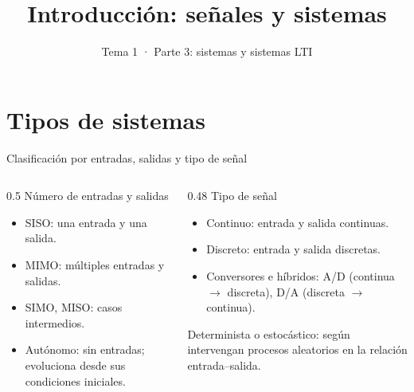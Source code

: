 \documentclass[aspectratio=169,11pt]{beamer}
\title[T1 · Sistemas]{Introducción: señales y sistemas}
\subtitle{Tema 1 · Parte 3: sistemas y sistemas LTI}
\begin{document}
\portada

\section{Tipos de sistemas}

\begin{frame}{Clasificación por entradas, salidas y tipo de señal}
  \begin{center}
  \end{center}
  \begin{columns}[T]
    \begin{column}{0.5\textwidth}
      \alert{Número de entradas y salidas}
      \begin{itemize}\small
        \item \alert{SISO}: una entrada y una salida.
        \item \alert{MIMO}: múltiples entradas y salidas.
        \item SIMO, MISO: casos intermedios.
        \item \alert{Autónomo}: sin entradas; evoluciona desde sus condiciones iniciales.
      \end{itemize}
    \end{column}
    \begin{column}{0.48\textwidth}
      \alert{Tipo de señal}
      \begin{itemize}\small
        \item \alert{Continuo}: entrada y salida continuas.
        \item \alert{Discreto}: entrada y salida discretas.
        \item \alert{Conversores e híbridos}: A/D (continua $\to$ discreta), D/A (discreta $\to$ continua).
      \end{itemize}
      \medskip
      \alert{Determinista} o \alert{estocástico}: según intervengan procesos aleatorios en la relación entrada–salida.
    \end{column}
  \end{columns}
\end{frame}
\end{document}
